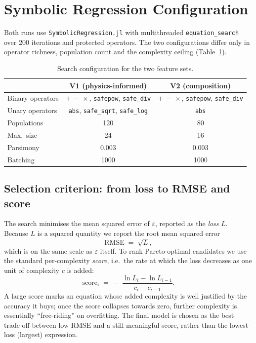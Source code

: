 \documentclass[11pt]{article}
\newcommand{\eps}{\varepsilon}
\begin{document}
\section{Symbolic Regression Configuration}

Both runs use \texttt{SymbolicRegression.jl} with multithreaded
\texttt{equation\_search} over \num{200} iterations and protected operators.
The two configurations differ only in operator richness, population count
and the complexity ceiling (Table~\ref{tab:config}).

\begin{table}[h]
\centering
\caption{Search configuration for the two feature sets.}
\label{tab:config}
\small
\begin{tabular}{lcc}
\toprule
 & \textbf{V1} (physics-informed) & \textbf{V2} (composition) \\
\midrule
Binary operators & $+\,-\,\times$, \texttt{safepow}, \texttt{safe\_div}
                 & $+\,-\,\times$, \texttt{safepow}, \texttt{safe\_div} \\
Unary operators  & \texttt{abs}, \texttt{safe\_sqrt}, \texttt{safe\_log}
                 & \texttt{abs} \\
Populations      & 120 & 80 \\
Max.\ size       & 24  & 16 \\
Parsimony        & 0.003 & 0.003 \\
Batching         & 1000 & 1000 \\
\bottomrule
\end{tabular}
\end{table}

\subsection{Selection criterion: from loss to RMSE and score}

The search minimises the mean squared error of $\eps$, reported as the
\emph{loss} $L$. Because $L$ is a squared quantity we report the root mean
squared error
\begin{equation}
  \mathrm{RMSE} \;=\; \sqrt{L},
\end{equation}
which is on the same scale as $\eps$ itself. To rank Pareto-optimal
candidates we use the standard per-complexity \emph{score}, i.e.\ the rate at
which the loss decreases as one unit of complexity $c$ is added:
\begin{equation}
  \mathrm{score}_i \;=\;
  -\,\frac{\ln L_i-\ln L_{i-1}}{c_i-c_{i-1}} .
  \label{eq:score}
\end{equation}
A large score marks an equation whose added complexity is well justified by
the accuracy it buys; once the score collapses towards zero, further
complexity is essentially ``free-riding'' on overfitting. The final model is
chosen as the best trade-off between low RMSE and a still-meaningful score,
rather than the lowest-loss (largest) expression.
\end{document}

